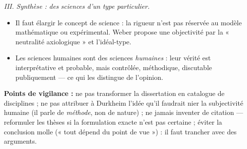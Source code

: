 \documentclass[11pt]{article}
\begin{document}
\begin{corrige}
\emph{III. Synthèse : des sciences d'un type particulier.}
\begin{itemize}
\item Il faut élargir le concept de science : la rigueur n'est pas réservée au modèle mathématique ou expérimental. Weber propose une objectivité par la « neutralité axiologique » et l'idéal-type.
\item Les sciences humaines sont des sciences \emph{humaines} : leur vérité est interprétative et probable, mais contrôlée, méthodique, discutable publiquement — ce qui les distingue de l'opinion.
\end{itemize}

\textbf{Points de vigilance :} ne pas transformer la dissertation en catalogue de disciplines ; ne pas attribuer à Durkheim l'idée qu'il faudrait nier la subjectivité humaine (il parle de \emph{méthode}, non de nature) ; ne jamais inventer de citation — reformuler les thèses si la formulation exacte n'est pas certaine ; éviter la conclusion molle (« tout dépend du point de vue ») : il faut trancher avec des arguments.
\end{corrige}
\end{document}
